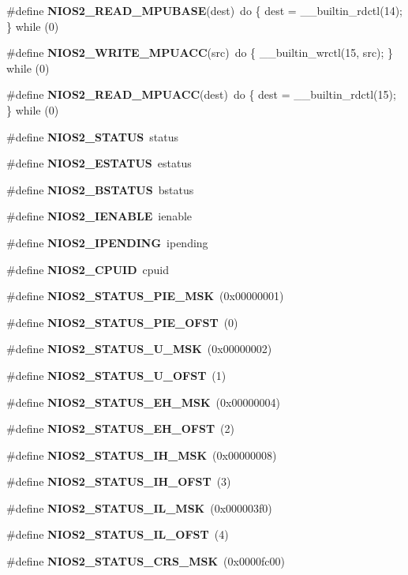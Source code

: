\begin{DoxyCompactItemize}
\#define {\bf N\+I\+O\+S2\+\_\+\+R\+E\+A\+D\+\_\+\+M\+P\+U\+B\+A\+SE}(dest)~do \{ dest = \+\_\+\+\_\+builtin\+\_\+rdctl(14); \} while (0)
\item 
\#define {\bf N\+I\+O\+S2\+\_\+\+W\+R\+I\+T\+E\+\_\+\+M\+P\+U\+A\+CC}(src)~do \{ \+\_\+\+\_\+builtin\+\_\+wrctl(15, src); \} while (0)
\item 
\#define {\bf N\+I\+O\+S2\+\_\+\+R\+E\+A\+D\+\_\+\+M\+P\+U\+A\+CC}(dest)~do \{ dest = \+\_\+\+\_\+builtin\+\_\+rdctl(15); \} while (0)
\item 
\#define {\bf N\+I\+O\+S2\+\_\+\+S\+T\+A\+T\+US}~status
\item 
\#define {\bf N\+I\+O\+S2\+\_\+\+E\+S\+T\+A\+T\+US}~estatus
\item 
\#define {\bf N\+I\+O\+S2\+\_\+\+B\+S\+T\+A\+T\+US}~bstatus
\item 
\#define {\bf N\+I\+O\+S2\+\_\+\+I\+E\+N\+A\+B\+LE}~ienable
\item 
\#define {\bf N\+I\+O\+S2\+\_\+\+I\+P\+E\+N\+D\+I\+NG}~ipending
\item 
\#define {\bf N\+I\+O\+S2\+\_\+\+C\+P\+U\+ID}~cpuid
\item 
\#define {\bf N\+I\+O\+S2\+\_\+\+S\+T\+A\+T\+U\+S\+\_\+\+P\+I\+E\+\_\+\+M\+SK}~(0x00000001)
\item 
\#define {\bf N\+I\+O\+S2\+\_\+\+S\+T\+A\+T\+U\+S\+\_\+\+P\+I\+E\+\_\+\+O\+F\+ST}~(0)
\item 
\#define {\bf N\+I\+O\+S2\+\_\+\+S\+T\+A\+T\+U\+S\+\_\+\+U\+\_\+\+M\+SK}~(0x00000002)
\item 
\#define {\bf N\+I\+O\+S2\+\_\+\+S\+T\+A\+T\+U\+S\+\_\+\+U\+\_\+\+O\+F\+ST}~(1)
\item 
\#define {\bf N\+I\+O\+S2\+\_\+\+S\+T\+A\+T\+U\+S\+\_\+\+E\+H\+\_\+\+M\+SK}~(0x00000004)
\item 
\#define {\bf N\+I\+O\+S2\+\_\+\+S\+T\+A\+T\+U\+S\+\_\+\+E\+H\+\_\+\+O\+F\+ST}~(2)
\item 
\#define {\bf N\+I\+O\+S2\+\_\+\+S\+T\+A\+T\+U\+S\+\_\+\+I\+H\+\_\+\+M\+SK}~(0x00000008)
\item 
\#define {\bf N\+I\+O\+S2\+\_\+\+S\+T\+A\+T\+U\+S\+\_\+\+I\+H\+\_\+\+O\+F\+ST}~(3)
\item 
\#define {\bf N\+I\+O\+S2\+\_\+\+S\+T\+A\+T\+U\+S\+\_\+\+I\+L\+\_\+\+M\+SK}~(0x000003f0)
\item 
\#define {\bf N\+I\+O\+S2\+\_\+\+S\+T\+A\+T\+U\+S\+\_\+\+I\+L\+\_\+\+O\+F\+ST}~(4)
\item 
\#define {\bf N\+I\+O\+S2\+\_\+\+S\+T\+A\+T\+U\+S\+\_\+\+C\+R\+S\+\_\+\+M\+SK}~(0x0000fc00)

\end{DoxyCompactItemize}
